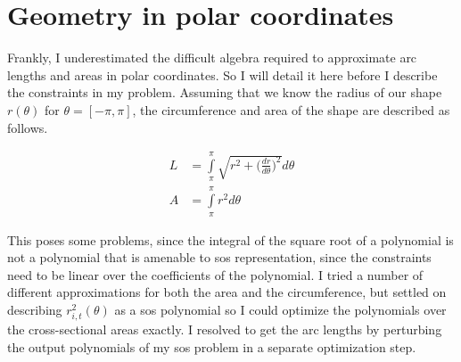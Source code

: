 \section{Geometry in polar coordinates}

Frankly, I underestimated the difficult algebra required to approximate
arc lengths and areas in polar coordinates. So I will detail it here
before I describe the constraints in my problem. Assuming that we
know the radius of our shape $r(\theta)$ for $\theta=[-\pi, \pi]$,
the circumference and area of the shape are described as follows.

\begin{align}
    L & = \int\limits_{\pi}^{\pi} \sqrt{r^2 + \Big(\frac{dr}{d\theta}\Big)^2} d\theta \\
    A & = \int\limits_{\pi}^{\pi} r^2 d\theta
\end{align}

This poses some problems, since the integral of the square root of a polynomial
is not a polynomial that is amenable to \gls{sos} representation, since the
constraints need to be linear over the coefficients of the polynomial.
I tried a number of different approximations for both the area and the circumference, but settled
on describing $r^2_{i,t}(\theta)$ as a \gls{sos} polynomial so I could
optimize the polynomials over the cross-sectional areas exactly. I resolved to
get the arc lengths by perturbing the output polynomials of my \gls{sos} problem
in a separate optimization step.
